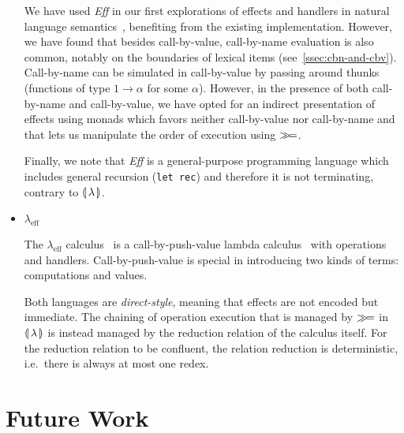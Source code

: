\begin{itemize}
  We have used \emph{Eff} in our first explorations of effects and handlers
  in natural language semantics~\cite{marsik2014algebraic}, benefiting from
  the existing implementation. However, we have found that besides
  call-by-value, call-by-name evaluation is also common, notably on the
  boundaries of lexical items (see~\ref{ssec:cbn-and-cbv}). Call-by-name
  can be simulated in call-by-value by passing around thunks (functions of
  type $1 \to \alpha$ for some $\alpha$). However, in the presence of both
  call-by-name and call-by-value, we have opted for an indirect
  presentation of effects using monads which favors neither call-by-value
  nor call-by-name and that lets us manipulate the order of execution using
  $\mathbin{\gg\!=}$.

  Finally, we note that \emph{Eff} is a general-purpose programming
  language which includes general recursion (\texttt{let rec}) and
  therefore it is not terminating, contrary to ${\llparenthesis \, \lambda \, \rrparenthesis}$.
  
\item $\lambda_{\mathrm{eff}}$

  The $\lambda_{\mathrm{eff}}$ calculus~\cite{kammar2013handlers} is a
  call-by-push-value lambda calculus~\cite{levy1999call} with operations
  and handlers. Call-by-push-value is special in introducing two kinds of
  terms: computations and values. 

  Both languages are \emph{direct-style}, meaning that
  effects are not encoded but immediate. The chaining of operation
  execution that is managed by $\mathbin{\gg\!=}$ in ${\llparenthesis \, \lambda \, \rrparenthesis}$ is instead managed by
  the reduction relation of the calculus itself. For the reduction relation
  to be confluent, the relation reduction is deterministic, i.e.\ there is
  always at most one redex.
\end{itemize}

\section{Future Work}
